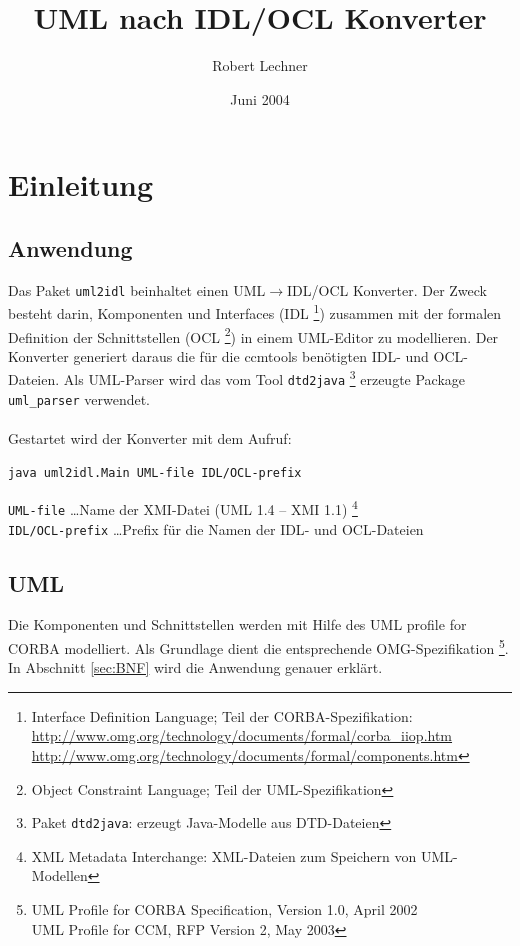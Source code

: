 \documentclass [a4paper,10pt] {scrartcl}
\author{Robert Lechner}
\title{UML nach IDL/OCL Konverter}
\date{Juni 2004}
\begin{document}
\maketitle
\tableofcontents
\cleardoublepage

\section{Einleitung}
\subsection{Anwendung}
Das Paket \texttt{uml2idl} beinhaltet einen \textsf{UML}$\rightarrow$\textsf{IDL/OCL}
Konverter. Der Zweck besteht darin, Komponenten und Interfaces (\textsf{IDL}
\footnote{Interface Definition Language; Teil der CORBA-Spezifikation:\\
\url{http://www.omg.org/technology/documents/formal/corba_iiop.htm}\\
\url{http://www.omg.org/technology/documents/formal/components.htm}
}) zusammen mit der
formalen Definition der Schnittstellen (\textsf{OCL}
\footnote{Object Constraint Language; Teil der UML-Spezifikation}) in einem \textsf{UML}-Editor
zu modellieren. Der Konverter generiert daraus die f{\"u}r die \textsf{ccmtools} ben{\"o}tigten
\textsf{IDL}- und \textsf{OCL}-Dateien.
Als \textsf{UML}-Parser wird das vom Tool \texttt{dtd2java}
\footnote{Paket \texttt{dtd2java}: erzeugt Java-Modelle aus DTD-Dateien}
erzeugte Package \texttt{uml\_parser} verwendet. \\
~\\
Gestartet wird der Konverter mit dem Aufruf:
\begin{verbatim}
java uml2idl.Main UML-file IDL/OCL-prefix
\end{verbatim}
\texttt{UML-file} \dots Name der \textsf{XMI}-Datei (\textsf{UML} 1.4 -- \textsf{XMI} 1.1)
\footnote{XML Metadata Interchange: XML-Dateien zum Speichern von UML-Modellen}\\
\texttt{IDL/OCL-prefix} \dots Prefix f{\"u}r die Namen der \textsf{IDL}- und \textsf{OCL}-Dateien
\subsection{UML}
Die Komponenten und Schnittstellen werden mit Hilfe des \textsf{UML profile for CORBA}
modelliert. Als Grundlage dient die entsprechende \textsf{OMG}-Spezifikation
\footnote{UML Profile for CORBA Specification, Version 1.0, April 2002\\
UML Profile for CCM, RFP Version 2, May 2003}.\\
In Abschnitt \ref{sec:BNF} wird die Anwendung genauer erkl{\"a}rt.
\end{document}
